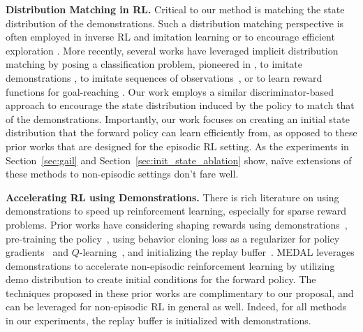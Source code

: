 \documentclass[nohyperref]{article}
\theoremstyle{plain}
\theoremstyle{definition}
\theoremstyle{remark}
\begin{document}
\textbf{Distribution Matching in RL.} Critical to our method is matching the state distribution of the demonstrations.
Such a distribution matching perspective is often employed in inverse RL \citep{ng2000algorithms,ziebart2008maximum, ziebart2010modeling,finn2016guided} and imitation learning \citep{ghasemipour2020divergence, argall2009survey} or to encourage efficient exploration \citep{lee2019efficient}. More recently, several works have leveraged implicit distribution matching by posing a classification problem, pioneered in \citet{goodfellow2014generative}, to imitate demonstrations \citep{ho2016generative,baram2017end,kostrikov2018discriminator,rafailov2021visual}, to imitate sequences of observations~\cite{torabi2019adversarial,zhu2020off}, or to learn reward functions for goal-reaching \citep{fu2018variational, singh2019end}. Our work employs a similar discriminator-based approach to encourage the state distribution induced by the policy to match that of the demonstrations. Importantly, our work focuses on creating an initial state distribution that the forward policy can learn efficiently from, as opposed to these prior works that are designed for the episodic RL setting. As the experiments in Section~\ref{sec:gail} and Section~\ref{sec:init_state_ablation} show, na\"ive extensions of these methods to non-episodic settings don't fare well.

\textbf{Accelerating RL using Demonstrations.} There is rich literature on using demonstrations to speed up reinforcement learning, especially for sparse reward problems.
Prior works have considering shaping rewards using demonstrations~\citep{brys2015reinforcement}, pre-training the policy~\citep{rajeswaran2017learning}, using behavior cloning loss as a regularizer for policy gradients~\citep{rajeswaran2017learning} and $Q$-learning~\citep{nair2018overcoming}, and initializing the replay buffer~\citep{nair2018overcoming, vecerik2017leveraging, hester2018deep}. MEDAL leverages demonstrations to accelerate non-episodic reinforcement learning by utilizing demo distribution to create initial conditions for the forward policy. The techniques proposed in these prior works are complimentary to our proposal, and can be leveraged for non-episodic RL in general as well. Indeed, for all methods in our experiments, the replay buffer is initialized with demonstrations.
\end{document}
